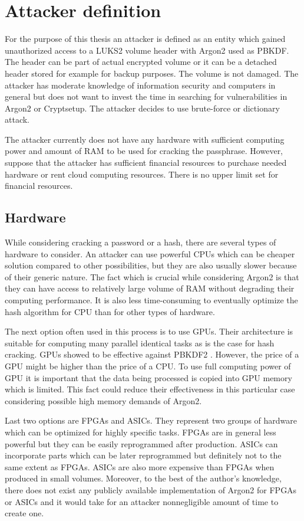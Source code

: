 \documentclass[nolof,digital]{fithesis3}
\begin{document}
\section{Attacker definition}
\label{sec:attacker}
For the purpose of this thesis an attacker is defined as an entity which gained unauthorized access to a LUKS2 volume header with Argon2 used as PBKDF. The header can be part of actual encrypted volume or it can be a detached header stored for example for backup purposes. The volume is not damaged. The attacker has moderate knowledge of information security and computers in general but does not want to invest the time in searching for vulnerabilities in Argon2 or Cryptsetup. The attacker decides to use brute-force or dictionary attack.

The attacker currently does not have any hardware with sufficient computing power and amount of RAM to be used for cracking the passphrase. However, suppose that the attacker has sufficient financial resources to purchase needed hardware or rent cloud computing resources. There is no upper limit set for financial resources.

\subsection{Hardware}
While considering cracking a password or a hash, there are several types of hardware to consider. An attacker can use powerful CPUs which can be cheaper solution compared to other possibilities, but they are also usually slower because of their generic nature. The fact which is crucial while considering Argon2 is that they can have access to relatively large volume of RAM without degrading their computing performance. It is also less time-consuming to eventually optimize the hash algorithm for CPU than for other types of hardware.

The next option often used in this process is to use GPUs. Their architecture is suitable for computing many parallel identical tasks as is the case for hash cracking. GPUs showed to be effective against PBKDF2 \parencite{mosnacek}. However, the price of a GPU might be higher than the price of a CPU. To use full computing power of GPU it is important that the data being processed is copied into GPU memory which is limited. This fact could reduce their effectiveness in this particular case considering possible high memory demands of Argon2.

Last two options are FPGAs and ASICs. They represent two groups of hardware which can be optimized for highly specific tasks. FPGAs are in general less powerful but they can be easily reprogrammed after production. ASICs can incorporate parts which can be later reprogrammed but definitely not to the same extent as FPGAs. ASICs are also more expensive than FPGAs when produced in small volumes. Moreover, to the best of the author's knowledge, there does not exist any publicly available implementation of Argon2 for FPGAs or ASICs and it would take for an attacker nonnegligible amount of time to create one.
\end{document}
